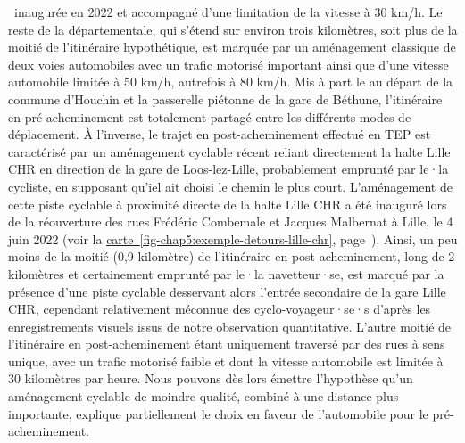 \begin{refsegment}
{}~inaugurée en 2022 et accompagné d'une limitation de la vitesse à 30 km/h. Le reste de la départementale, qui s'étend sur environ trois kilomètres, soit plus de la moitié de l'itinéraire hypothétique, est marquée par un aménagement classique de deux voies automobiles avec un trafic motorisé important ainsi que d'une vitesse automobile limitée à 50 km/h, autrefois à 80 km/h. Mis à part le  au départ de la commune d'Houchin et la passerelle piétonne de la gare de Béthune, l'itinéraire en pré-acheminement est totalement partagé entre les différents modes de déplacement. À l'inverse, le trajet en post-acheminement effectué en \acrshort{TEP} est caractérisé par un aménagement cyclable récent reliant directement la halte Lille CHR en direction de la gare de Loos-lez-Lille, probablement emprunté par le·la cycliste, en supposant qu'iel ait choisi le chemin le plus court. L'aménagement de cette piste cyclable à proximité directe de la halte Lille CHR a été inauguré lors de la réouverture des rues Frédéric Combemale et Jacques Malbernat à Lille, le 4 juin 2022 (voir la \hyperref[fig-chap5:exemple-detours-lille-chr]{carte~\ref{fig-chap5:exemple-detours-lille-chr}}, page~\pageref{fig-chap5:exemple-detours-lille-chr}). Ainsi, un peu moins de la moitié (0,9 kilomètre) de l'itinéraire en post-acheminement, long de 2 kilomètres et certainement emprunté par le·la navetteur·se, est marqué par la présence d'une piste cyclable desservant alors l'entrée secondaire de la gare Lille CHR, cependant relativement méconnue des cyclo-voyageur·se·s d'après les enregistrements visuels issus de notre observation quantitative. L'autre moitié de l'itinéraire en post-acheminement étant uniquement traversé par des rues à sens unique, avec un trafic motorisé faible et dont la vitesse automobile est limitée à 30 kilomètres par heure. Nous pouvons dès lors émettre l'hypothèse qu'un aménagement cyclable de moindre qualité, combiné à une distance plus importante, explique partiellement le choix en faveur de l'automobile pour le pré-acheminement.%


\end{refsegment}
